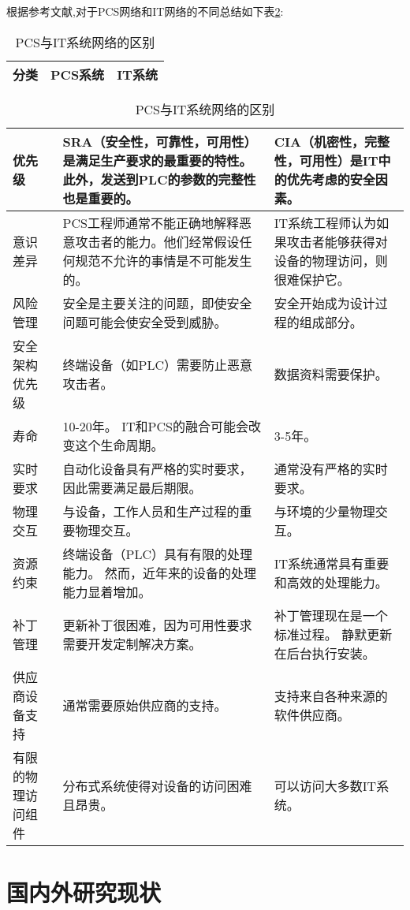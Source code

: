 根据参考文献\parencite{Byres09},对于PCS网络和IT网络的不同总结如下表\ref{intro:diffBetweenPCSandIT}:
\newcommand{\tabincell}[2]{\begin{tabular}{@{}#1@{}}#2\end{tabular}}
\begin{table}[!htp]
\centering
\caption{PCS与IT系统网络的区别}
\label{intro:diffBetweenPCSandIT}
\begin{tabular}{|p{2cm}<{\centering}|p{6cm}<{\centering}|p{6cm}<{\centering}|}
\hline
分类 & PCS系统 & IT系统 \\
\hline
\end{tabular}
\begin{tabular}{|p{2cm}|p{6cm}|p{6cm}|}
\hline
优先级 & SRA（安全性，可靠性，可用性）是满足生产要求的最重要的特性。此外，发送到PLC的参数的完整性也是重要的。 & CIA（机密性，完整性，可用性）是IT中的优先考虑的安全因素。 \\
\hline
意识差异 & PCS工程师通常不能正确地解释恶意攻击者的能力。他们经常假设任何规范不允许的事情是不可能发生的。 & IT系统工程师认为如果攻击者能够获得对设备的物理访问，则很难保护它。 \\
\hline
风险管理 & 安全是主要关注的问题，即使安全问题可能会使安全受到威胁。 & 安全开始成为设计过程的组成部分。 \\
\hline
安全架构优先级 & 终端设备（如PLC）需要防止恶意攻击者。 & 数据资料需要保护。 \\
\hline
寿命 & 10-20年。 IT和PCS的融合可能会改变这个生命周期。 & 3-5年。 \\
\hline
实时要求 & 自动化设备具有严格的实时要求，因此需要满足最后期限。 & 通常没有严格的实时要求。 \\
\hline
物理交互 & 与设备，工作人员和生产过程的重要物理交互。 & 与环境的少量物理交互。 \\
\hline
资源约束 & 终端设备（PLC）具有有限的处理能力。 然而，近年来的设备的处理能力显着增加。 & IT系统通常具有重要和高效的处理能力。 \\
\hline
补丁管理 & 更新补丁很困难，因为可用性要求 需要开发定制解决方案。 & 补丁管理现在是一个标准过程。 静默更新在后台执行安装。 \\
\hline
供应商设备支持 & 通常需要原始供应商的支持。 & 支持来自各种来源的软件供应商。 \\
\hline
有限的物理访问组件 & 分布式系统使得对设备的访问困难且昂贵。 & 可以访问大多数IT系统。\\
\hline
\end{tabular}
\end{table}


\section{国内外研究现状}


